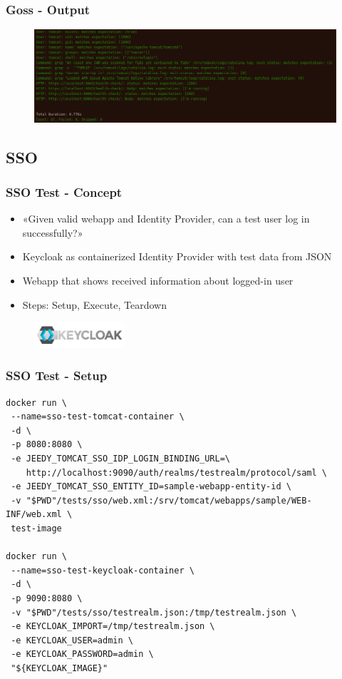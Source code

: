 \documentclass[14pt,aspectratio=169]{beamer}
\begin{document}
\begin{frame}[fragile]
  \frametitle{Goss - Output}
  \begin{figure}
    \includegraphics[width=\textwidth]{images/goss.png}
  \end{figure}
\end{frame}


\subsection{SSO}

\begin{frame}
  \frametitle{SSO Test - Concept} 
  \begin{itemize}
    \item «Given valid webapp and Identity Provider, can a test user log in successfully?»
    \item Keycloak as containerized Identity Provider with test data from JSON
    \item Webapp that shows received information about logged-in user
    \item Steps: Setup, Execute, Teardown
  \end{itemize}
  \begin{figure}
    \includegraphics[width=0.3\textwidth]{images/keycloak_logo.png}
  \end{figure}
\end{frame}

\begin{frame}[fragile]
  \frametitle{SSO Test - Setup}

  \begin{verbatim}
docker run \
 --name=sso-test-tomcat-container \
 -d \
 -p 8080:8080 \
 -e JEEDY_TOMCAT_SSO_IDP_LOGIN_BINDING_URL=\
    http://localhost:9090/auth/realms/testrealm/protocol/saml \
 -e JEEDY_TOMCAT_SSO_ENTITY_ID=sample-webapp-entity-id \
 -v "$PWD"/tests/sso/web.xml:/srv/tomcat/webapps/sample/WEB-INF/web.xml \
 test-image

docker run \
 --name=sso-test-keycloak-container \
 -d \
 -p 9090:8080 \
 -v "$PWD"/tests/sso/testrealm.json:/tmp/testrealm.json \
 -e KEYCLOAK_IMPORT=/tmp/testrealm.json \
 -e KEYCLOAK_USER=admin \
 -e KEYCLOAK_PASSWORD=admin \
 "${KEYCLOAK_IMAGE}"
  \end{verbatim}
\end{frame}
\end{document}
